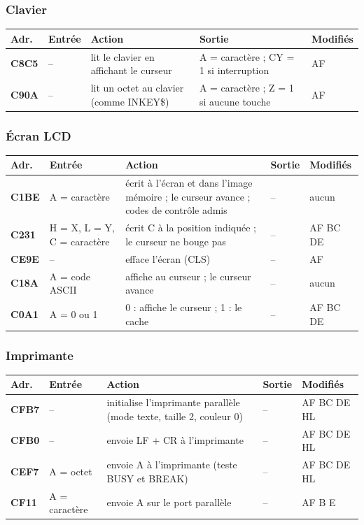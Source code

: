 \documentclass[a4paper,10pt]{article}
\makeatletter
\newenvironment{routines}
  {\small\begin{longtable}{@{}>{\ttfamily\bfseries}p{1.1cm}>{\raggedright}p{4.0cm}>{\raggedright}p{5.0cm}>{\raggedright}p{3.1cm}>{\raggedright\arraybackslash}p{2.1cm}@{}}
   \toprule
   \normalfont\bfseries Adr. & \textbf{Entrée} & \textbf{Action} & \textbf{Sortie} & \textbf{Modifiés}\\
   \midrule\endhead
   \bottomrule\endfoot}
  {\end{longtable}}
\makeatother
\begin{document}
\subsubsection*{Clavier}
\begin{routines}
C8C5 & -- & lit le clavier en affichant le curseur & A = caractère ; CY = 1 si interruption & AF \\
C90A & -- & lit un octet au clavier (comme INKEY\$) & A = caractère ; Z = 1 si aucune touche & AF \\
\end{routines}

\subsubsection*{Écran LCD}
\begin{routines}
C1BE & A = caractère & écrit à l'écran et dans l'image mémoire ; le curseur avance ; codes de contrôle admis & -- & aucun \\
C231 & H = X, L = Y, C = caractère & écrit C à la position indiquée ; le curseur ne bouge pas & -- & AF BC DE \\
CE9E & -- & efface l'écran (CLS) & -- & AF \\
C18A & A = code ASCII & affiche au curseur ; le curseur avance & -- & aucun \\
C0A1 & A = 0 ou 1 & 0 : affiche le curseur ; 1 : le cache & -- & AF BC DE \\
\end{routines}

\subsubsection*{Imprimante}
\begin{routines}
CFB7 & -- & initialise l'imprimante parallèle (mode texte, taille 2, couleur 0) & -- & AF BC DE HL \\
CFB0 & -- & envoie LF + CR à l'imprimante & -- & AF BC DE HL \\
CEF7 & A = octet & envoie A à l'imprimante (teste BUSY et BREAK) & -- & AF BC DE HL \\
CF11 & A = caractère & envoie A sur le port parallèle & -- & AF B E \\
\end{routines}
\end{document}
